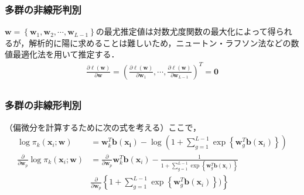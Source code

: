 \documentclass[dvipdfmx,cjk]{beamer}
\theoremstyle{example}
\begin{document}
\begin{frame}
    \frametitle{多群の非線形判別}
    $\boldsymbol{w}=\left\{\boldsymbol{w}_1,\boldsymbol{w}_2,\cdots ,\boldsymbol{w}_{L-1}\right\}$の最尤推定値は対数尤度関数の最大化によって得られるが，解析的に陽に求めることは難しいため，ニュートン・ラフソン法などの数値最適化法を用いて推定する．
    \begin{align*}
        \frac{\partial \ell(\boldsymbol{w})}{\partial \boldsymbol{w}}=(\frac{\partial \ell(\boldsymbol{w})}{\partial \boldsymbol{w}_1},\cdots , \frac{\partial \ell(\boldsymbol{w})}{\partial \boldsymbol{w}_{L-1}})^T=\boldsymbol{0} \\
    \end{align*}
\end{frame}

\begin{frame}
    \frametitle{多群の非線形判別}
    （偏微分を計算するために次の式を考える）ここで，
    \begin{align*}
        \log \pi_k(\boldsymbol{x}_i;\boldsymbol{w})                                            & =\boldsymbol{w}_k^T\boldsymbol{b}(\boldsymbol{x_i})-\log(1+\sum\limits_{g=1}^{L-1}\exp\left\{\boldsymbol{w}_g^T\boldsymbol{b}(\boldsymbol{x}_i)\right\})                                               \\
        \frac{\partial}{\partial \boldsymbol{w}_p} \log \pi_k(\boldsymbol{x}_i;\boldsymbol{w}) & =\frac{\partial}{\partial \boldsymbol{w}_p}\boldsymbol{w}_k^T\boldsymbol{b}(\boldsymbol{x}_i)-\frac{1}{1+\sum\limits_{g=1}^{L-1}\exp\left\{\boldsymbol{w}_g^T\boldsymbol{b}(\boldsymbol{x}_i)\right\}} \\
                                                                                               & \frac{\partial}{\partial \boldsymbol{w}_p}\left\{1+\sum\limits_{g=1}^{L-1}\exp\left\{\boldsymbol{w}_g^T\boldsymbol{b}(\boldsymbol{x}_i)\right\})\right\}\tag{B}
    \end{align*}
\end{frame}
\end{document}
